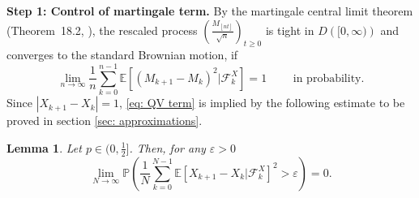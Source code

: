 \documentclass[twoside,12pt, a4paper, final]{article}
\newtheorem{lemma}{Lemma}[section]
\numberwithin{equation}{section}
\theoremstyle{remark}
\newcommand{\abs}[1]{\left\vert #1 \right\vert}
\begin{document}
	\vspace{1em}
	
	\textbf{Step 1: Control of martingale term.}
	By the martingale central limit theorem (Theorem~18.2, \cite{B99}), the rescaled process $\left( \frac{M_{\left\lfloor n t \right\rfloor}}{\sqrt{n}} \right) _{t \ge 0}$ is tight in $D\left( [0,\infty ) \right) $ and converges to the standard Brownian motion, if
	\begin{equation}\label{eq: QV term}
		\lim_{n\to \infty}\frac{1}{n} \sum_{k=0}^{n-1}\mathbb{E}\left[ (M_{k+1}- M_{k})^2 |\mathcal{F}_k^X \right] =1 \qquad  \mbox{ in probability}.
	\end{equation}
	Since $\abs{X_{k+1}-X_k}=1$, \eqref{eq: QV term} is implied by the following estimate to be proved in section \ref{sec: approximations}. 
	\begin{lemma} \label{lm: control of martingale} 
		Let $p\in (0,\frac{1}{2}]$. Then, for any $\varepsilon >0$
		\begin{equation}\label{eq:  term}
			\lim_{N \to \infty }\mathbb{P}\left(\frac{1}{N} \sum_{k = 0}^{N-1} \mathbb{E}\left[ X_{k+1} - X_k | \mathcal{F}_k^X \right]^2 > \varepsilon \right) =0. 
		\end{equation}
	\end{lemma}
	\vspace{1em}
	
\end{document}
